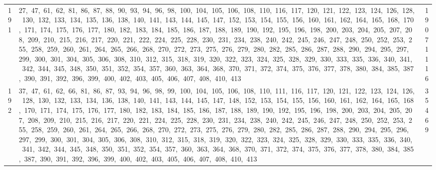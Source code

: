 \begin{longtable}{c|p{}|r}
191 & 27,\ 47,\ 61,\ 62,\ 81,\ 86,\ 87,\ 88,\ 90,\ 93,\ 94,\ 96,\ 98,\ 100,\ 104,\ 105,\ 106,\ 108,\ 110,\ 116,\ 117,\ 120,\ 121,\ 122,\ 123,\ 124,\ 126,\ 128,\ 130,\ 132,\ 133,\ 134,\ 135,\ 136,\ 138,\ 140,\ 141,\ 143,\ 144,\ 145,\ 147,\ 152,\ 153,\ 154,\ 155,\ 156,\ 160,\ 161,\ 162,\ 164,\ 165,\ 168,\ 170,\ 171,\ 174,\ 175,\ 176,\ 177,\ 180,\ 182,\ 183,\ 184,\ 185,\ 186,\ 187,\ 188,\ 189,\ 190,\ 192,\ 195,\ 196,\ 198,\ 200,\ 203,\ 204,\ 205,\ 207,\ 208,\ 209,\ 210,\ 215,\ 216,\ 217,\ 220,\ 221,\ 222,\ 224,\ 225,\ 228,\ 230,\ 231,\ 234,\ 238,\ 240,\ 242,\ 245,\ 246,\ 247,\ 248,\ 250,\ 252,\ 253,\ 255,\ 258,\ 259,\ 260,\ 261,\ 264,\ 265,\ 266,\ 268,\ 270,\ 272,\ 273,\ 275,\ 276,\ 279,\ 280,\ 282,\ 285,\ 286,\ 287,\ 288,\ 290,\ 294,\ 295,\ 297,\ 299,\ 300,\ 301,\ 304,\ 305,\ 306,\ 308,\ 310,\ 312,\ 315,\ 318,\ 319,\ 320,\ 322,\ 323,\ 324,\ 325,\ 328,\ 329,\ 330,\ 333,\ 335,\ 336,\ 340,\ 341,\ 342,\ 344,\ 345,\ 348,\ 350,\ 351,\ 352,\ 354,\ 357,\ 360,\ 363,\ 364,\ 368,\ 370,\ 371,\ 372,\ 374,\ 375,\ 376,\ 377,\ 378,\ 380,\ 384,\ 385,\ 387,\ 390,\ 391,\ 392,\ 396,\ 399,\ 400,\ 402,\ 403,\ 405,\ 406,\ 407,\ 408,\ 410,\ 413 & 19071116 \\
192 & 37,\ 47,\ 61,\ 62,\ 66,\ 81,\ 86,\ 87,\ 93,\ 94,\ 96,\ 98,\ 99,\ 100,\ 104,\ 105,\ 106,\ 108,\ 110,\ 111,\ 116,\ 117,\ 120,\ 121,\ 122,\ 123,\ 124,\ 126,\ 128,\ 130,\ 132,\ 133,\ 134,\ 136,\ 138,\ 140,\ 141,\ 143,\ 144,\ 145,\ 147,\ 148,\ 152,\ 153,\ 154,\ 155,\ 156,\ 160,\ 161,\ 162,\ 164,\ 165,\ 168,\ 170,\ 171,\ 174,\ 175,\ 176,\ 177,\ 180,\ 182,\ 183,\ 184,\ 185,\ 186,\ 187,\ 188,\ 189,\ 190,\ 192,\ 195,\ 196,\ 198,\ 200,\ 203,\ 204,\ 205,\ 207,\ 208,\ 209,\ 210,\ 215,\ 216,\ 217,\ 220,\ 221,\ 224,\ 225,\ 228,\ 230,\ 231,\ 234,\ 238,\ 240,\ 242,\ 245,\ 246,\ 247,\ 248,\ 250,\ 252,\ 253,\ 255,\ 258,\ 259,\ 260,\ 261,\ 264,\ 265,\ 266,\ 268,\ 270,\ 272,\ 273,\ 275,\ 276,\ 279,\ 280,\ 282,\ 285,\ 286,\ 287,\ 288,\ 290,\ 294,\ 295,\ 296,\ 297,\ 299,\ 300,\ 301,\ 304,\ 305,\ 306,\ 308,\ 310,\ 312,\ 315,\ 318,\ 319,\ 320,\ 322,\ 323,\ 324,\ 325,\ 328,\ 329,\ 330,\ 333,\ 335,\ 336,\ 340,\ 341,\ 342,\ 344,\ 345,\ 348,\ 350,\ 351,\ 352,\ 354,\ 357,\ 360,\ 363,\ 364,\ 368,\ 370,\ 371,\ 372,\ 374,\ 375,\ 376,\ 377,\ 378,\ 380,\ 384,\ 385,\ 387,\ 390,\ 391,\ 392,\ 396,\ 399,\ 400,\ 402,\ 403,\ 405,\ 406,\ 407,\ 408,\ 410,\ 413 & 35469 \\

\end{longtable}
